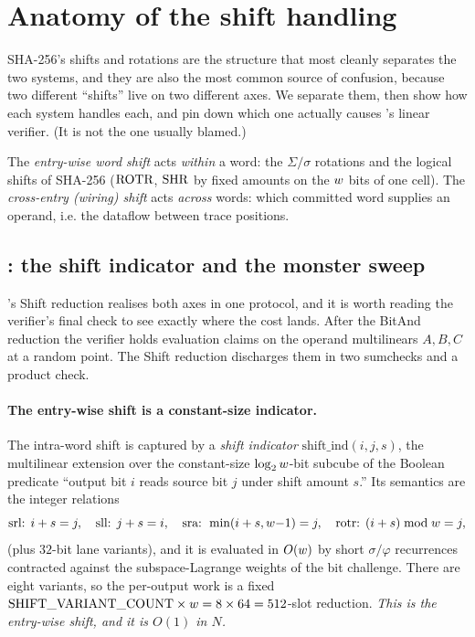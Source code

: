 \section{Anatomy of the shift handling}
\label{sec:shifts}

SHA-256's shifts and rotations are the structure that most cleanly
separates the two systems, and they are also the most common source of
confusion, because two different ``shifts'' live on two different axes.
We separate them, then show how each system handles each, and pin down
which one actually causes \binius{}'s linear verifier. (It is not the one
usually blamed.)

\begin{definition}
\label{def:two-shifts}
The \emph{entry-wise word shift} acts \emph{within} a word: the
$\Sigma/\sigma$ rotations and the logical shifts of SHA-256
($\operatorname{ROTR}$, $\operatorname{SHR}$ by fixed amounts on the $w$ bits of one cell). The
\emph{cross-entry (wiring) shift} acts \emph{across} words: which
committed word supplies an operand, i.e. the dataflow between trace
positions.
\end{definition}

\subsection{\binius{}: the shift indicator and the monster sweep}
\label{sec:shifts-binius}

\binius{}'s Shift reduction realises both axes in one protocol, and it is
worth reading the verifier's final check to see exactly where the cost
lands. After the BitAnd reduction the verifier holds evaluation claims on
the operand multilinears $A,B,C$ at a random point. The Shift reduction
discharges them in two sumchecks and a product check.

\paragraph{The entry-wise shift is a constant-size indicator.}
The intra-word shift is captured by a \emph{shift indicator}
$\mathrm{shift\_ind}(i,j,s)$, the multilinear extension over the
constant-size $\log_2w$-bit subcube of the Boolean predicate ``output
bit $i$ reads source bit $j$ under shift amount $s$.'' Its semantics are
the integer relations
\[
  \text{srl: } i+s=j, \quad
  \text{sll: } j+s=i, \quad
  \text{sra: } \min(i+s,w{-}1)=j, \quad
  \text{rotr: } (i+s)\bmod w = j,
\]
(plus $32$-bit lane variants), and it is evaluated in $O(w)$ by short
$\sigma/\varphi$ recurrences contracted against the subspace-Lagrange
weights of the bit challenge. There are eight variants, so the per-output
work is a fixed $\mathrm{SHIFT\_VARIANT\_COUNT}\times w = 8\times 64 =
512$-slot reduction. \emph{This is the entry-wise shift, and it is
$O(1)$ in $N$.}

